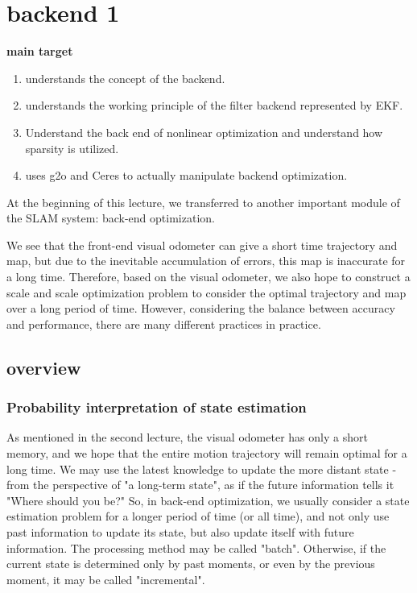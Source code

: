 \chapter{backend 1}
\label{cpt:backend1}
\begin{mdframed}
    \textbf{main target}
        \begin{enumerate}[labelindent=0em,leftmargin=1.5em]
            \item understands the concept of the backend.
            \item understands the working principle of the filter backend represented by EKF.
            \item Understand the back end of nonlinear optimization and understand how sparsity is utilized.
            \item uses g2o and Ceres to actually manipulate backend optimization.
        \end{enumerate}
\end{mdframed}

At the beginning of this lecture, we transferred to another important module of the SLAM system: back-end optimization.

We see that the front-end visual odometer can give a short time trajectory and map, but due to the inevitable accumulation of errors, this map is inaccurate for a long time. Therefore, based on the visual odometer, we also hope to construct a scale and scale optimization problem to consider the optimal trajectory and map over a long period of time. However, considering the balance between accuracy and performance, there are many different practices in practice.

\newpage


\newpage
\section{overview}
\subsection{Probability interpretation of state estimation}
As mentioned in the second lecture, the visual odometer has only a short memory, and we hope that the entire motion trajectory will remain optimal for a long time. We may use the latest knowledge to update the more distant state - from the perspective of "a long-term state", as if the future information tells it "Where should you be?" So, in back-end optimization, we usually consider a state estimation problem for a longer period of time (or all time), and not only use past information to update its state, but also update itself with future information. The processing method may be called "batch". Otherwise, if the current state is determined only by past moments, or even by the previous moment, it may be called "incremental".

